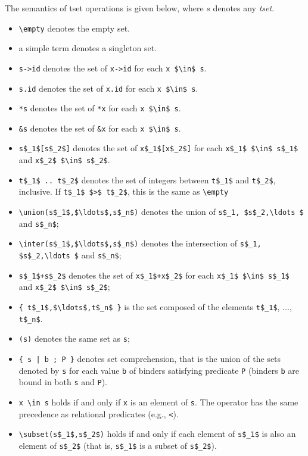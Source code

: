 The semantics of tset operations is given below,
where $s$ denotes any \textsl{tset}.
\begin{itemize}
\item \lstinline|\empty| denotes the empty set.
\item a simple term denotes a singleton set.
\item \lstinline|s->id| denotes the set of \lstinline|x->id| for each
  \lstinline|x $\in$ s|.
\item \lstinline|s.id| denotes the set of \lstinline|x.id| for each
  \lstinline|x $\in$ s|.
\item \lstinline|*s| denotes the set of \lstinline|*x| for each
  \lstinline|x $\in$ s|.
\item \lstinline|&s| denotes the set of \lstinline|&x| for each
  \lstinline|x $\in$ s|.
\item \lstinline|s$_1$[s$_2$]| denotes the set of
\lstinline|x$_1$[x$_2$]| for each \lstinline|x$_1$ $\in$ s$_1$|
  and \lstinline|x$_2$ $\in$ s$_2$|.
\item \lstinline|t$_1$ .. t$_2$| denotes the set of integers between 
\lstinline|t$_1$| and \lstinline|t$_2$|, inclusive. 
If \lstinline|t$_1$ $>$ t$_2$|, this is the same as \lstinline+\empty+
\item \lstinline|\union(s$_1$,$\ldots$,s$_n$)|
denotes the union 
of \lstinline|s$_1, $s$_2,\ldots $| and \lstinline|s$_n$|;
\item \lstinline|\inter(s$_1$,$\ldots$,s$_n$)|
denotes the intersection 
of \lstinline|s$_1, $s$_2,\ldots $| and \lstinline|s$_n$|;
\item \lstinline|s$_1$+s$_2$| denotes the set of
  \lstinline|x$_1$+x$_2$| for each \lstinline|x$_1$ $\in$ s$_1$|
  and \lstinline|x$_2$ $\in$ s$_2$|;
\item \lstinline|{ t$_1$,$\ldots$,t$_n$ }| is the set composed of the
elements \lstinline|t$_1$|, $\ldots$, \lstinline|t$_n$|.
\item \lstinline|(s)| denotes the same set as \lstinline|s|;
\item \lstinline+{ s | b ; P }+ denotes set
  comprehension,
  that is the union of the sets denoted by \lstinline|s| for each
  value \lstinline|b| of binders
  satisfying predicate \lstinline|P|
  (binders \lstinline|b| are bound in both \lstinline|s| and \lstinline|P|).
\item \lstinline|x \in s| holds if and only if \lstinline|x| is an element of \lstinline|s|.
  The operator has the same precedence as relational predicates (e.g., \lstinline|<|).
\item \lstinline|\subset(s$_1$,s$_2$)| holds if and only if each element
  of \lstinline|s$_1$| is also an element of \lstinline|s$_2$|
  (that is, \lstinline|s$_1$| is a subset of \lstinline|s$_2$|).
\end{itemize}

